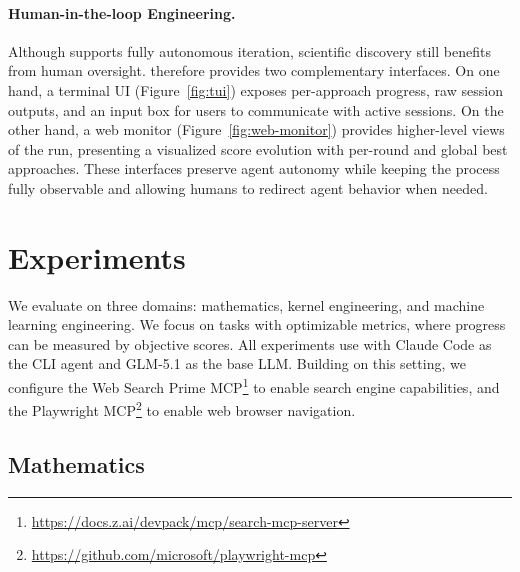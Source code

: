 \documentclass{article} %
\begin{document}
   \paragraph{Human-in-the-loop Engineering.}
   Although \method supports fully autonomous iteration, scientific discovery still benefits from human oversight.
   \method therefore provides two complementary interfaces.
   On one hand, a terminal UI (Figure~\ref{fig:tui}) exposes per-approach progress, raw session outputs, and an input box for users to communicate with active sessions.
   On the other hand, a web monitor (Figure~\ref{fig:web-monitor}) provides higher-level views of the run, presenting a visualized score evolution with per-round and global best approaches.
   These interfaces preserve agent autonomy while keeping the process fully observable and allowing humans to redirect agent behavior when needed.
   
   
   
   \section{Experiments}
   
   We evaluate \method on three domains: mathematics, kernel engineering, and machine learning engineering.
   We focus on tasks with optimizable metrics, where progress can be measured by objective scores.
   All experiments use \method
   with Claude Code as the CLI agent and GLM-5.1 as the base LLM.
   Building on this setting, we configure the Web Search Prime MCP\footnote{\url{https://docs.z.ai/devpack/mcp/search-mcp-server}} to enable search engine capabilities, and the Playwright MCP\footnote{\url{https://github.com/microsoft/playwright-mcp}} to enable web browser navigation.
   
   
   \subsection{Mathematics}
   
\end{document}
